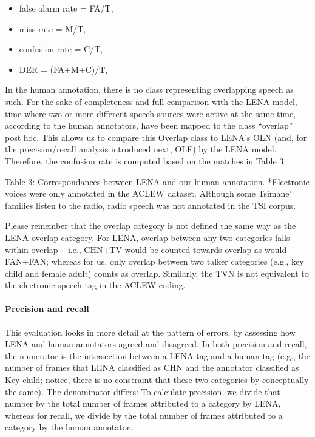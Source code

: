 \documentclass[english,floatsintext,man]{apa6}
\providecommand{\tightlist}{%
  \setlength{\itemsep}{0pt}\setlength{\parskip}{0pt}}
\begin{document}
\begin{itemize}
\tightlist
\item
  false alarm rate = FA/T,
\item
  miss rate = M/T,
\item
  confusion rate = C/T,
\item
  DER = (FA+M+C)/T,
\end{itemize}

In the human annotation, there is no class representing overlapping
speech as such. For the sake of completeness and full comparison with
the LENA model, time where two or more different speech sources were
active at the same time, according to the human annotators, have been
mapped to the class \enquote{overlap} post hoc. This allows us to
compare this Overlap class to LENA's OLN (and, for the precision/recall
analysis introduced next, OLF) by the LENA model. Therefore, the
confusion rate is computed based on the matches in Table 3.

Table 3: Correspondances between LENA and our human annotation.
*Electronic voices were only annotated in the ACLEW dataset. Although
some Tsimane' families listen to the radio, radio speech was not
annotated in the TSI corpus.

Please remember that the overlap category is not defined the same way as
the LENA overlap category. For LENA, overlap between any two categories
falls within overlap -- i.e., CHN+TV would be counted towards overlap as
would FAN+FAN; whereas for us, only overlap between two talker
categories (e.g., key child and female adult) counts as overlap.
Similarly, the TVN is not equivalent to the electronic speech tag in the
ACLEW coding.

\paragraph{Precision and recall}\label{precision-and-recall}

This evaluation looks in more detail at the pattern of errors, by
assessing how LENA and human annotators agreed and disagreed. In both
precision and recall, the numerator is the intersection between a LENA
tag and a human tag (e.g., the number of frames that LENA classified as
CHN and the annotator classified as Key child; notice, there is no
constraint that these two categories by conceptually the same). The
denominator differs: To calculate precision, we divide that number by
the total number of frames attributed to a category by LENA, whereas for
recall, we divide by the total number of frames attributed to a category
by the human annotator.
\end{document}
